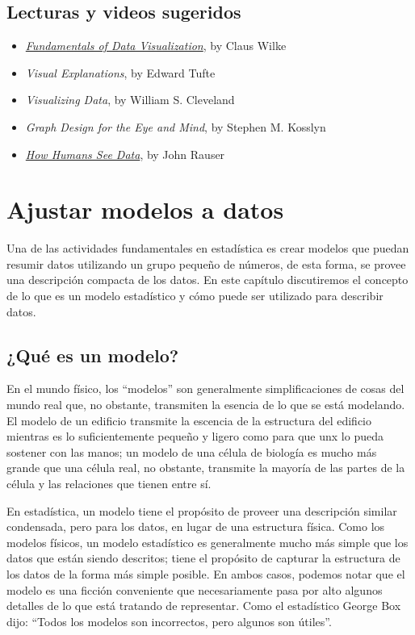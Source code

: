 \documentclass[
  12pt,
]{book}
\providecommand{\tightlist}{%
  \setlength{\itemsep}{0pt}\setlength{\parskip}{0pt}}
\begin{document}
\hypertarget{lecturas-y-videos-sugeridos}{%
\section{Lecturas y videos sugeridos}\label{lecturas-y-videos-sugeridos}}

\begin{itemize}
\tightlist
\item
  \href{https://serialmentor.com/dataviz/}{\emph{Fundamentals of Data Visualization}}, by Claus Wilke
\item
  \emph{Visual Explanations}, by Edward Tufte
\item
  \emph{Visualizing Data}, by William S. Cleveland
\item
  \emph{Graph Design for the Eye and Mind}, by Stephen M. Kosslyn
\item
  \href{https://www.youtube.com/watch?v=fSgEeI2Xpdc\&feature=youtu.be}{\emph{How Humans See Data}}, by John Rauser
\end{itemize}

\hypertarget{fitting-models}{%
\chapter{Ajustar modelos a datos}\label{fitting-models}}

Una de las actividades fundamentales en estadística es crear modelos que puedan resumir datos utilizando un grupo pequeño de números, de esta forma, se provee una descripción compacta de los datos. En este capítulo discutiremos el concepto de lo que es un modelo estadístico y cómo puede ser utilizado para describir datos.

\hypertarget{quuxe9-es-un-modelo}{%
\section{¿Qué es un modelo?}\label{quuxe9-es-un-modelo}}

En el mundo físico, los ``modelos'' son generalmente simplificaciones de cosas del mundo real que, no obstante, transmiten la esencia de lo que se está modelando. El modelo de un edificio transmite la escencia de la estructura del edificio mientras es lo suficientemente pequeño y ligero como para que unx lo pueda sostener con las manos; un modelo de una célula de biología es mucho más grande que una célula real, no obstante, transmite la mayoría de las partes de la célula y las relaciones que tienen entre sí.

En estadística, un modelo tiene el propósito de proveer una descripción similar condensada, pero para los datos, en lugar de una estructura física. Como los modelos físicos, un modelo estadístico es generalmente mucho más simple que los datos que están siendo descritos; tiene el propósito de capturar la estructura de los datos de la forma más simple posible. En ambos casos, podemos notar que el modelo es una ficción conveniente que necesariamente pasa por alto algunos detalles de lo que está tratando de representar. Como el estadístico George Box dijo: ``Todos los modelos son incorrectos, pero algunos son útiles''.
\end{document}
